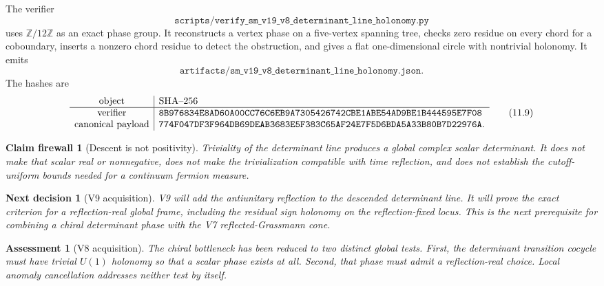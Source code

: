 \documentclass[11pt]{article}
\newtheorem{firewall}[theorem]{Claim firewall}
\newtheorem{decision}[theorem]{Next decision}
\newtheorem{assessment}[theorem]{Assessment}
\theoremstyle{remark}
\begin{document}
The verifier
\[
 \texttt{scripts/verify\_sm\_v19\_v8\_determinant\_line\_holonomy.py}
                                                                  \tag{11.7}
\]
uses \(\mathbb Z/12\mathbb Z\) as an exact phase group.  It reconstructs a
vertex phase on a five-vertex spanning tree, checks zero residue on every
chord for a coboundary, inserts a nonzero chord residue to detect the
obstruction, and gives a flat one-dimensional circle with nontrivial
holonomy.  It emits
\[
 \texttt{artifacts/sm\_v19\_v8\_determinant\_line\_holonomy.json}.
                                                                  \tag{11.8}
\]
The hashes are
\[
\begin{array}{c|l}
\hbox{object}&\hbox{SHA--256}\\ \hline
\hbox{verifier}&
\texttt{8B976834E8AD60A00CC76C6EB9A7305426742CBE1ABE54AD9BE1B444595E7F08}\\
\hbox{canonical payload}&
\texttt{774F047DF3F964DB69DEAB3683E5F383C65AF24E7F5D6BDA5A33B80B7D22976A}.
\end{array}                                                     \tag{11.9}
\]

\begin{firewall}[Descent is not positivity]
\label{fire:v19v8}
Triviality of the determinant line produces a global complex scalar
determinant.  It does not make that scalar real or nonnegative, does not
make the trivialization compatible with time reflection, and does not
establish the cutoff-uniform bounds needed for a continuum fermion
measure.
\end{firewall}

\begin{decision}[V9 acquisition]
\label{dec:v19v8-next}
V9 will add the antiunitary reflection to the descended determinant line.
It will prove the exact criterion for a reflection-real global frame,
including the residual sign holonomy on the reflection-fixed locus.  This
is the next prerequisite for combining a chiral determinant phase with
the V7 reflected-Grassmann cone.
\end{decision}

\begin{assessment}[V8 acquisition]
\label{ass:v19v8}
The chiral bottleneck has been reduced to two distinct global tests.
First, the determinant transition cocycle must have trivial \(U(1)\)
holonomy so that a scalar phase exists at all.  Second, that phase must
admit a reflection-real choice.  Local anomaly cancellation addresses
neither test by itself.
\end{assessment}
\end{document}
